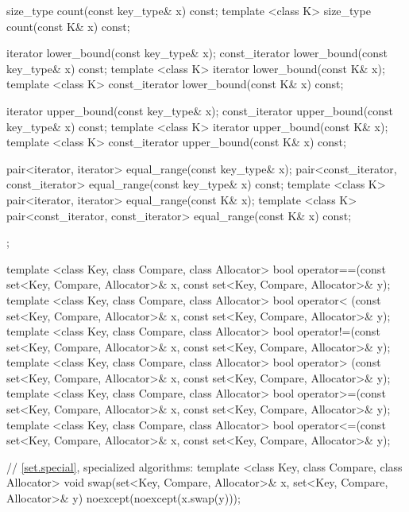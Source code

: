 \begin{codeblock}
{{    size_type      count(const key_type& x) const;
    template <class K> size_type count(const K& x) const;

    iterator       lower_bound(const key_type& x);
    const_iterator lower_bound(const key_type& x) const;
    template <class K> iterator       lower_bound(const K& x);
    template <class K> const_iterator lower_bound(const K& x) const;

    iterator       upper_bound(const key_type& x);
    const_iterator upper_bound(const key_type& x) const;
    template <class K> iterator       upper_bound(const K& x);
    template <class K> const_iterator upper_bound(const K& x) const;

    pair<iterator, iterator>               equal_range(const key_type& x);
    pair<const_iterator, const_iterator>   equal_range(const key_type& x) const;
    template <class K>
      pair<iterator, iterator>             equal_range(const K& x);
    template <class K>
      pair<const_iterator, const_iterator> equal_range(const K& x) const;
  };

  template <class Key, class Compare, class Allocator>
    bool operator==(const set<Key, Compare, Allocator>& x,
                    const set<Key, Compare, Allocator>& y);
  template <class Key, class Compare, class Allocator>
    bool operator< (const set<Key, Compare, Allocator>& x,
                    const set<Key, Compare, Allocator>& y);
  template <class Key, class Compare, class Allocator>
    bool operator!=(const set<Key, Compare, Allocator>& x,
                    const set<Key, Compare, Allocator>& y);
  template <class Key, class Compare, class Allocator>
    bool operator> (const set<Key, Compare, Allocator>& x,
                    const set<Key, Compare, Allocator>& y);
  template <class Key, class Compare, class Allocator>
    bool operator>=(const set<Key, Compare, Allocator>& x,
                    const set<Key, Compare, Allocator>& y);
  template <class Key, class Compare, class Allocator>
    bool operator<=(const set<Key, Compare, Allocator>& x,
                    const set<Key, Compare, Allocator>& y);

  // \ref{set.special}, specialized algorithms:
  template <class Key, class Compare, class Allocator>
    void swap(set<Key, Compare, Allocator>& x,
              set<Key, Compare, Allocator>& y)
      noexcept(noexcept(x.swap(y)));
}
\end{codeblock}%
%

